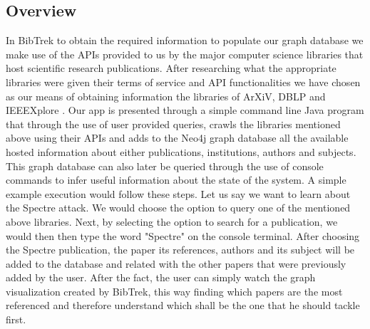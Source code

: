 \documentclass[twocolumn]{article}
\begin{document}
\subsection{Overview}
In BibTrek to obtain the required information to populate our graph database we make use of the APIs provided to us by the major computer science libraries that host scientific research publications. After researching what the appropriate libraries were given their terms of service and API functionalities we have chosen as our means of obtaining information the libraries of ArXiV, DBLP and IEEEXplore \cite{arxiv, dblp, ieeexplore}. Our app is presented through a simple command line Java program that through the use of user provided queries, crawls the libraries mentioned above using their APIs and adds to the Neo4j graph database all the available hosted information about either publications, institutions, authors and subjects. This graph database can also later be queried through the use of console commands to infer useful information about the state of the system. A simple example execution would follow these steps. Let us say we want to learn about the Spectre attack. We would choose the option to query one of the mentioned above libraries. Next, by selecting the option to search for a publication, we would then then type the word "Spectre" on the console terminal. After choosing the Spectre publication, the paper its references, authors and its subject will be added to the database and related with the other papers that were previously added by the user. After the fact, the user can simply watch the graph visualization created by BibTrek, this way finding which papers are the most referenced and therefore understand which shall be the one that he should tackle first.
\end{document}
